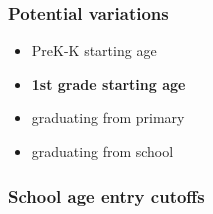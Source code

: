 \documentclass{beamer}
\begin{document}
\begin{frame}
    \label{update_scott}
    \frametitle{Potential variations}
    \begin{itemize}
        \item PreK-K starting age
        \item \textbf{1st grade starting age}
        \item graduating from primary
        \item graduating from school
    \end{itemize}
\end{frame}

\begin{frame}
    \label{update_scott}
    \frametitle{School age entry cutoffs}
 {
    }
\end{frame}
\end{document}
